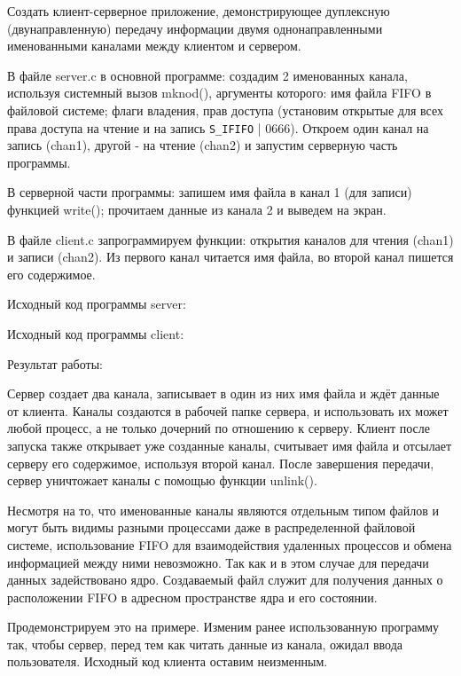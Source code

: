 \documentclass[a4paper]{article}
\begin{document}
	Создать клиент-серверное приложение, демонстрирующее дуплексную (двунаправленную) передачу информации двумя однонаправленными именованными каналами между клиентом и сервером.
	
	В файле server.c в основной программе: создадим 2 именованных канала, используя системный вызов mknod(), аргументы которого: имя файла FIFO в файловой системе; флаги владения, прав доступа (установим открытые для всех права доступа на чтение и на запись \texttt{S\_IFIFO} | 0666). Откроем один канал на запись (chan1), другой - на чтение (chan2) и запустим серверную часть программы.
	
	В серверной части программы: запишем имя файла в канал 1 (для записи) функцией write(); прочитаем данные из канала 2 и выведем на экран.

	В файле client.c запрограммируем функции: открытия каналов для чтения (chan1) и записи (chan2). Из первого канал читается имя файла, во второй канал пишется его содержимое.
	
	Исходный код программы server:
	
		
	Исходный код программы client:
	
	
	Результат работы:
	
	
	Сервер создает два канала, записывает в один из них имя файла и ждёт данные от клиента. Каналы создаются в рабочей папке сервера, и использовать их может любой процесс, а не только дочерний по отношению к серверу. Клиент после запуска также открывает уже созданные каналы, считывает имя файла и отсылает серверу его содержимое, используя второй канал. После завершения передачи, сервер уничтожает каналы с помощью функции unlink().
	
	Несмотря на то, что именованные каналы являются отдельным типом файлов и могут быть видимы разными процессами даже в распределенной файловой системе, использование FIFO для взаимодействия удаленных процессов и обмена информацией между ними невозможно. Так как и в этом случае для передачи данных задействовано ядро. Создаваемый файл служит для получения данных о расположении FIFO в адресном пространстве ядра и его состоянии.
	
	Продемонстрируем это на примере. Изменим ранее использованную программу так, чтобы сервер, перед тем как читать данные из канала, ожидал ввода пользователя. Исходный код клиента оставим неизменным.
\end{document}

